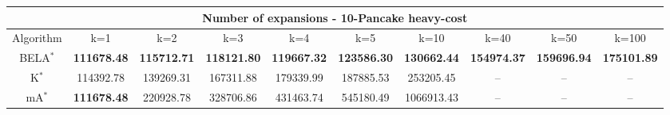 \begin{tabular}{c|ccccccccc}\toprule
\multicolumn{10}{c}{Number of expansions - 10-Pancake heavy-cost}\\ \midrule
Algorithm & k=1 & k=2 & k=3 & k=4 & k=5 & k=10 & k=40 & k=50 & k=100 \\ \midrule
BELA$^*$ & \textbf{111678.48} & \textbf{115712.71} & \textbf{118121.80} & \textbf{119667.32} & \textbf{123586.30} & \textbf{130662.44} & \textbf{154974.37} & \textbf{159696.94} & \textbf{175101.89} \\
K$^*$ & 114392.78 & 139269.31 & 167311.88 & 179339.99 & 187885.53 & 253205.45 & -- & -- & -- \\
mA$^*$ & \textbf{111678.48} & 220928.78 & 328706.86 & 431463.74 & 545180.49 & 1066913.43 & -- & -- & -- \\ \bottomrule 
\end{tabular}
